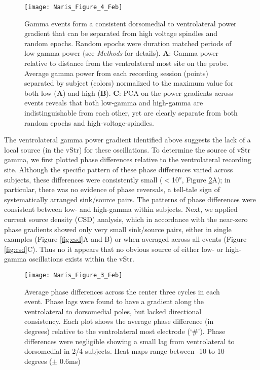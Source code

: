 \documentclass[11pt]{article}
\makeatletter
\newcommand{\bsf}[1]{\textbf{#1}}
\newcommand{\degree}{$^o$\@\xspace}
\makeatother
\begin{document}
\begin{figure}[h]
\centering \texttt{[image: Naris\_Figure\_4\_Feb]}
\caption{Gamma events form a consistent dorsomedial to ventrolateral
  power gradient that can be separated from high voltage spindles and
  random epochs. Random epochs were duration matched periods of low
  gamma power (see {\it Methods} for details). \bsf{A}: Gamma power
  relative to distance from the ventrolateral most site on the
  probe. Average gamma power from each recording session (points)
  separated by subject (colors) normalized to the maximum value for
  both low (\bsf{A}) and high (\bsf{B}). \bsf{C}: PCA on the power
  gradients across events reveals that both low-gamma and high-gamma
  are indistinguishable from each other, yet are clearly separate from
  both random epochs and high-voltage-spindles.}
\label{fig:distance}
\end{figure}

The ventrolateral gamma power gradient identified above suggests the
lack of a local source (in the vStr) for these oscillations. To
determine the source of vStr gamma, we first plotted phase differences
relative to the ventrolateral recording site. Although the specific
pattern of these phase differences varied across subjects, these
differences were consistently small ($<$10\degree, Figure
\ref{fig:phase}A); in particular, there was no evidence of phase
reversals, a tell-tale sign of systematically arranged sink/source
pairs. The patterns of phase differences were consistent between low-
and high-gamma within subjects. Next, we applied current source
density (CSD) analysis, which in accordance with the near-zero phase
gradients showed only very small sink/source pairs, either in single
examples (Figure \ref{fig:csd}A and B) or when averaged across all
events (Figure \ref{fig:csd}C). Thus no it appears that no obvious
source of either low- or high-gamma oscillations exists within the
vStr.

\begin{figure}[h]
\centering
\texttt{[image: Naris\_Figure\_3\_Feb]}
\caption{Average phase differences across the center three cycles in
  each event.  Phase lags were found to have a gradient along the
  ventrolateral to dorsomedial poles, but lacked directional
  consistency. Each plot shows the average phase difference (in
  degrees) relative to the ventrolateral most electrode (‘\#’). Phase
  differences were negligible showing a small lag from ventrolateral
  to dorsomedial in 2/4 subjects. Heat maps range between -10 to 10
  degrees ($\pm$ 0.6ms)}
\label{fig:phase}
\end{figure}
\end{document}
